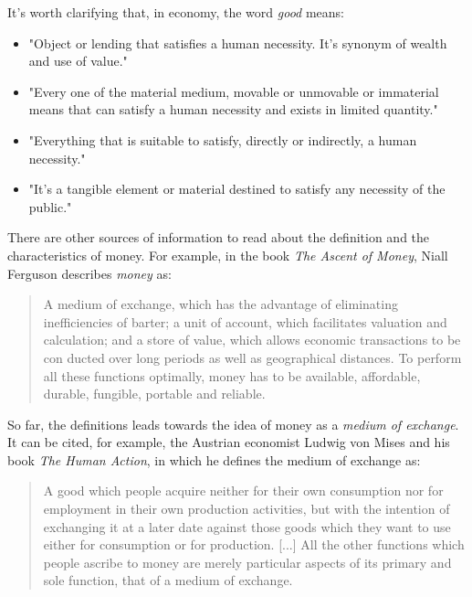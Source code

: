 \documentclass[12pt,a4paper,twoside]{book}
\begin{document}
It's worth clarifying that, in economy, the word \textit{good} means:

\begin{itemize}
\item "Object or lending that satisfies a human necessity. It's synonym of wealth and use of value." \cite[p. 1687]{dic:espasacalpe}
\item "Every one of the material medium, movable or unmovable or immaterial means that can satisfy a human necessity and exists in limited quantity." \cite{dic:clarin}
\item "Everything that is suitable to satisfy, directly or indirectly, a human necessity." \cite{rae}
\item "It's a tangible element or material destined to satisfy any necessity of the public." \cite{epedia:bien}
\end{itemize}

There are other sources of information to read about the definition and the characteristics of money. For example, in the book \textit{The Ascent of Money}, Niall Ferguson describes \textit{money} as:

\begin{quotation}
A medium of exchange, which has the advantage of eliminating inefficiencies of barter; a unit of account, which facilitates valuation and calculation; and a store of value, which allows economic transactions to be con­ ducted over long periods as well as geographical distances. To perform all these functions optimally, money has to be available, affordable, durable, fungible, portable and reliable. \cite[pp. 23-24]{ferguson:ascent-money}
\end{quotation}

So far, the definitions leads towards the idea of money as a \textit{medium of exchange}. It can be cited, for example, the Austrian economist Ludwig von Mises and his book \textit{The Human Action}, in which he defines the medium of exchange as:

\begin{quotation}
A good which people acquire neither for their own consumption nor for employment in their own production activities, but with the intention of exchanging it at a later date against those goods which they want to use either for consumption or for production. [...] All the other functions which people ascribe to money are merely particular aspects of its primary and sole function, that of a medium of exchange. \cite[p. 398]{mises:ha}
\end{quotation}
\end{document}
